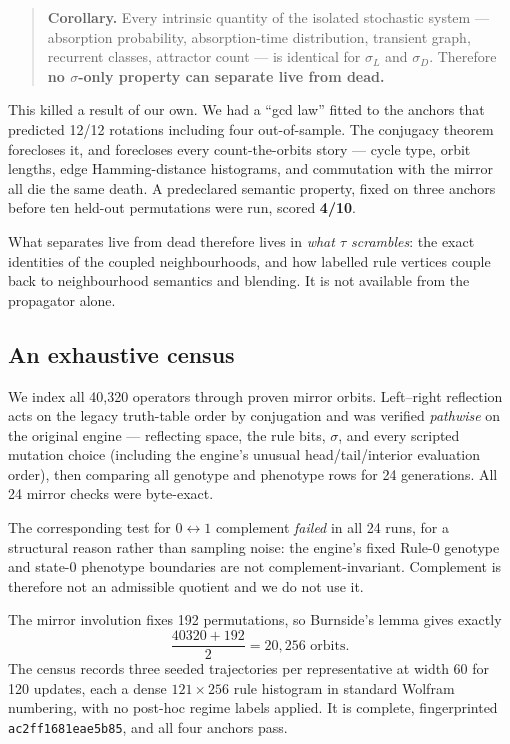 \documentclass[man,12pt,floatsintext]{apa7}
\newcommand{\sig}{\sigma}
\begin{document}
\begin{quote}
\textbf{Corollary.} Every intrinsic quantity of the isolated stochastic
system --- absorption probability, absorption-time distribution, transient
graph, recurrent classes, attractor count --- is identical for $\sig_L$
and $\sig_D$. Therefore \textbf{no $\sig$-only property can separate live
from dead.}
\end{quote}

This killed a result of our own. We had a ``gcd law'' fitted to the
anchors that predicted 12/12 rotations including four out-of-sample. The
conjugacy theorem forecloses it, and forecloses every
count-the-orbits story --- cycle type, orbit lengths, edge Hamming-distance
histograms, and commutation with the mirror all die the same death. A
predeclared semantic property, fixed on three anchors before ten held-out
permutations were run, scored \textbf{4/10}.

What separates live from dead therefore lives in \emph{what $\tau$
scrambles}: the exact identities of the coupled neighbourhoods, and how
labelled rule vertices couple back to neighbourhood semantics and
blending. It is not available from the propagator alone.

\subsection{An exhaustive census}
\label{sec:census}

We index all 40{,}320 operators through proven mirror orbits. Left--right
reflection acts on the legacy truth-table order by conjugation and was
verified \emph{pathwise} on the original engine --- reflecting space, the
rule bits, $\sig$, and every scripted mutation choice (including the
engine's unusual head/tail/interior evaluation order), then comparing all
genotype and phenotype rows for 24 generations. All 24 mirror checks were
byte-exact.

The corresponding test for $0 \leftrightarrow 1$ complement \emph{failed}
in all 24 runs, for a structural reason rather than sampling noise: the
engine's fixed Rule-0 genotype and state-0 phenotype boundaries are not
complement-invariant. Complement is therefore not an admissible quotient
and we do not use it.

The mirror involution fixes 192 permutations, so Burnside's lemma gives
exactly
\[
  \frac{40320 + 192}{2} = 20{,}256 \text{ orbits.}
\]
The census records three seeded trajectories per representative at width
60 for 120 updates, each a dense $121 \times 256$ rule histogram in
standard Wolfram numbering, with no post-hoc regime labels applied. It is
complete, fingerprinted \texttt{ac2ff1681eae5b85}, and all four anchors
pass.
\end{document}
